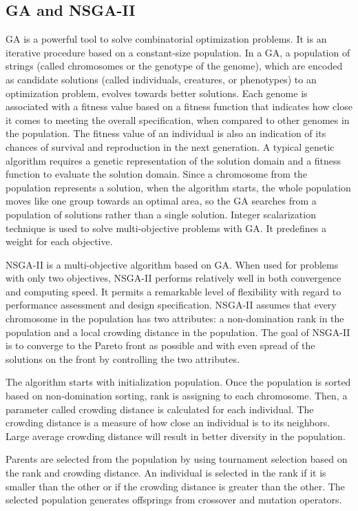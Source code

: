\documentclass{llncs}
\begin{document}
\subsection{GA and NSGA-II}
GA \cite{man1996genetic} is a powerful tool to solve combinatorial optimization problems. It is an iterative procedure based on a constant-size population. In a GA, a population of strings (called chromosomes
or the genotype of the genome), which are encoded as candidate solutions (called individuals, creatures, or phenotypes) to an optimization problem, evolves towards better solutions. 
Each genome is associated with a fitness value based on a fitness function that indicates how close it comes to meeting the overall specification, when compared to other genomes in the
population. The fitness value of an individual is also an indication of its chances of survival and reproduction in the next generation. A typical genetic algorithm requires a genetic
representation of the solution domain and a fitness function to evaluate the solution domain. Since a chromosome from the population represents a solution, when the algorithm starts, 
the whole population moves like one group towards an optimal area, so the GA searches from a population of solutions rather than a single solution. Integer scalarization technique \cite{Multiobjective} is 
used to solve multi-objective problems with GA. It predefines a weight for each objective.

NSGA-II is a multi-objective algorithm based on GA. When used for problems with only two objectives, NSGA-II performs 
relatively well in both convergence and  computing speed. It permits a remarkable level of flexibility with regard to 
performance assessment and design specification. NSGA-II assumes that every chromosome in the population has two 
attributes: a non-domination rank in the population and a local crowding distance in the population. The goal of 
NSGA-II is to converge to the Pareto front as possible and with even spread of the solutions on the front by 
controlling the two attributes. 

The algorithm starts with initialization population. Once the population is sorted based on non-domination sorting, rank is assigning to each chromosome.
Then, a parameter called crowding distance is calculated for each individual. The crowding distance is a measure of how close an individual is to its neighbors. Large 
average crowding distance will result in better diversity in the population. 

Parents are selected from the population by using tournament selection based on the rank and crowding distance. An individual is selected in the rank if it is smaller than the other or 
if the crowding distance is greater than the other. The selected population generates offsprings from crossover and mutation operators. 
\end{document}
